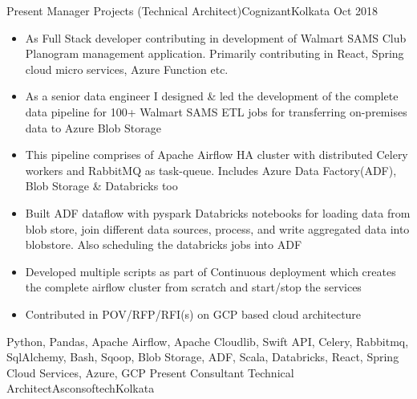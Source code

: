  \begin{experiences}
  \experience
    {Present}     {Manager Projects (Technical Architect)}{Cognizant}{Kolkata}
    {Oct 2018}    {
                      \begin{itemize}
                        \item As Full Stack developer contributing in development of Walmart SAMS Club Planogram management application. Primarily contributing in React, Spring cloud micro services, Azure Function etc. 
                        \item As a senior data engineer I designed \& led the development of the complete data pipeline for 100+ Walmart SAMS ETL jobs for transferring on-premises data to Azure Blob Storage
                        \item This pipeline comprises of Apache Airflow HA cluster with distributed Celery workers and RabbitMQ as task-queue. Includes Azure Data Factory(ADF), Blob Storage \& Databricks too 
                        \item Built ADF dataflow with pyspark Databricks notebooks for loading data from blob store,  join different data sources, process, and write aggregated data into blobstore. Also scheduling the databricks jobs into ADF
                        \item Developed multiple scripts as part of Continuous deployment which creates the complete airflow cluster from scratch and start/stop the services
                        \item Contributed in POV/RFP/RFI(s) on GCP based cloud architecture 
                      \end{itemize}
                  }
                  {Python, Pandas, Apache Airflow, Apache Cloudlib, 
                    Swift API, Celery, Rabbitmq, SqlAlchemy, Bash, Sqoop, Blob Storage, ADF, Scala, Databricks, React, Spring Cloud Services, Azure, GCP}
  \emptySeparator
  \experience
    {Present}   {Consultant Technical Architect}{Asconsoftech}{Kolkata}

\end{experiences}
